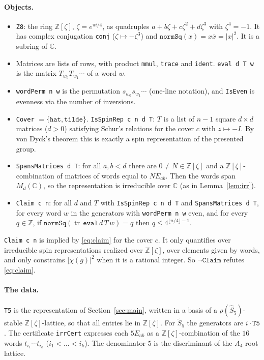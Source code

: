 \documentclass[11pt]{article}
\theoremstyle{remark}
\newcommand{\tr}{\operatorname{tr}}
\newcommand{\Sh}{\widehat{S}}
\newcommand{\St}{\widetilde{S}}
\begin{document}
\paragraph{Objects.}
\begin{itemize}
\item \texttt{Z8}: the ring $\mathbb{Z}[\zeta]$, $\zeta=e^{\pi i/4}$, as quadruples
  $a+b\zeta+c\zeta^2+d\zeta^3$ with $\zeta^4=-1$. It has complex conjugation \texttt{conj}
  ($\zeta\mapsto-\zeta^3$) and $\texttt{normSq}(x)=x\bar x=|x|^2$. It is a subring of $\mathbb{C}$.
\item Matrices are lists of rows, with product \texttt{mmul}, \texttt{trace} and \texttt{ident}.
  \texttt{eval d T w} is the matrix $T_{w_0}T_{w_1}\cdots$ of a word $w$.
\item \texttt{wordPerm n w} is the permutation $s_{w_0}s_{w_1}\cdots$ (one-line notation), and
  \texttt{IsEven} is evenness via the number of inversions.
\item \texttt{Cover} $=\{\texttt{hat},\texttt{tilde}\}$. \texttt{IsSpinRep c n d T}: $T$ is a list of
  $n-1$ square $d\times d$ matrices ($d>0$) satisfying Schur's relations for the cover $c$ with
  $z\mapsto-I$. By von Dyck's theorem this is exactly a spin representation of the presented group.
\item \texttt{SpansMatrices d T}: for all $a,b<d$ there are $0\ne N\in\mathbb{Z}[\zeta]$ and a
  $\mathbb{Z}[\zeta]$-combination of matrices of words equal to $N E_{ab}$. Then the words span
  $M_d(\mathbb{C})$, so the representation is irreducible over $\mathbb{C}$ (as in
  Lemma~\ref{lem:irr}).
\item \texttt{Claim c n}: for all $d$ and $T$ with \texttt{IsSpinRep c n d T} and
  \texttt{SpansMatrices d T}, for every word $w$ in the generators with \texttt{wordPerm n w} even,
  and for every $q\in\mathbb{Z}$, if $\texttt{normSq}(\tr\,\texttt{eval}\,d\,T\,w)=q$ then
  $q\le 4^{\lfloor n/4\rfloor-1}$.
\end{itemize}
\texttt{Claim c n} is implied by \eqref{eq:claim} for the cover $c$. It only quantifies over
irreducible spin representations realized over $\mathbb{Z}[\zeta]$, over elements given by words,
and only constrains $|\chi(g)|^2$ when it is a rational integer. So $\neg\texttt{Claim}$ refutes
\eqref{eq:claim}.

\paragraph{The data.} \texttt{T5} is the representation of Section~\ref{sec:main}, written in a
basis of a $\rho(\Sh_5)$-stable $\mathbb{Z}[\zeta]$-lattice, so that all entries lie in
$\mathbb{Z}[\zeta]$. For $\St_5$ the generators are $i\cdot\texttt{T5}$. The certificate
\texttt{irrCert} expresses each $5E_{ab}$ as a $\mathbb{Z}[\zeta]$-combination of the $16$ words
$t_{i_1}\cdots t_{i_k}$ ($i_1<\dots<i_k$). The denominator $5$ is the discriminant of the
$A_4$ root lattice.
\end{document}
